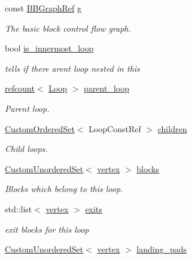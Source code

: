 \begin{DoxyCompactItemize}
\item 
const \hyperlink{basic__block_8hpp_a0e7f233d1b83cad0bfd5aa865f0d3532}{B\+B\+Graph\+Ref} \hyperlink{classLoop_a86837f1c0a1b4263e3a98a4d383a8206}{g}
\begin{DoxyCompactList}\small\item\em The basic block control flow graph. \end{DoxyCompactList}\item 
bool \hyperlink{classLoop_a6cebf8444a5558f4d234c44cd38d469c}{is\+\_\+innermost\+\_\+loop}
\begin{DoxyCompactList}\small\item\em tells if there aren\textquotesingle{}t loop nested in this \end{DoxyCompactList}\item 
\hyperlink{structrefcount}{refcount}$<$ \hyperlink{classLoop}{Loop} $>$ \hyperlink{classLoop_a5c7792deff68092ff3ccf7017da15ee7}{parent\+\_\+loop}
\begin{DoxyCompactList}\small\item\em Parent loop. \end{DoxyCompactList}\item 
\hyperlink{classCustomOrderedSet}{Custom\+Ordered\+Set}$<$ Loop\+Const\+Ref $>$ \hyperlink{classLoop_a7bdbddbc6bdb106b481d29c618299910}{children}
\begin{DoxyCompactList}\small\item\em Child loops. \end{DoxyCompactList}\item 
\hyperlink{classCustomUnorderedSet}{Custom\+Unordered\+Set}$<$ \hyperlink{graph_8hpp_abefdcf0544e601805af44eca032cca14}{vertex} $>$ \hyperlink{classLoop_a3d39b106d02938689930f6295662ea75}{blocks}
\begin{DoxyCompactList}\small\item\em Blocks which belong to this loop. \end{DoxyCompactList}\item 
std\+::list$<$ \hyperlink{graph_8hpp_abefdcf0544e601805af44eca032cca14}{vertex} $>$ \hyperlink{classLoop_a882ea006765bbc1a326e6016ac77dcf1}{exits}
\begin{DoxyCompactList}\small\item\em exit blocks for this loop \end{DoxyCompactList}\item 
\hyperlink{classCustomUnorderedSet}{Custom\+Unordered\+Set}$<$ \hyperlink{graph_8hpp_abefdcf0544e601805af44eca032cca14}{vertex} $>$ \hyperlink{classLoop_a11d02df2d5f7628dff21768eed8a4239}{landing\+\_\+pads}

\end{DoxyCompactItemize}
